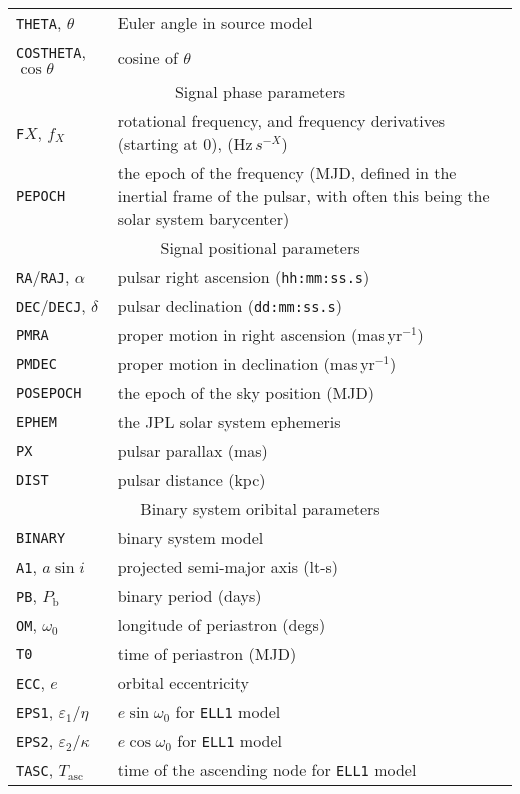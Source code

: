 \begin{longtable}{p{}|p{}}
{\tt THETA}, $\theta$ & Euler angle in source model \citep[see][]{2015MNRAS.453.4399P} \\
{\tt COSTHETA}, $\cos{\theta}$ & cosine of $\theta$ \\
\hline
\multicolumn{2}{c}{Signal phase parameters} \\
\hline
{\tt F}$X$, $f_X$ & rotational frequency, and frequency derivatives (starting at 0), (Hz$\,s^{-X}$) \\
{\tt PEPOCH} & the epoch of the frequency (MJD, defined in the inertial frame of the pulsar, with often this being the solar system barycenter) \\
\hline
\multicolumn{2}{c}{Signal positional parameters} \\
\hline
{\tt RA}/{\tt RAJ}, $\alpha$ & pulsar right ascension ({\tt hh:mm:ss.s}) \\
{\tt DEC}/{\tt DECJ}, $\delta$ & pulsar declination ({\tt dd:mm:ss.s}) \\
{\tt PMRA} & proper motion in right ascension (mas\,yr$^{-1}$) \\
{\tt PMDEC} & proper motion in declination (mas\,yr$^{-1}$) \\
{\tt POSEPOCH} & the epoch of the sky position (MJD) \\
{\tt EPHEM} & the JPL solar system ephemeris \\
{\tt PX} & pulsar parallax (mas) \\
{\tt DIST} & pulsar distance (kpc) \\
\hline
\multicolumn{2}{c}{Binary system oribital parameters} \\
\hline
{\tt BINARY} & binary system model \citep[see e.g.][and references therein]{1989ApJ...345..434T} \\
{\tt A1}, $a\sin{i}$ & projected semi-major axis (lt-s) \\
{\tt PB}, $P_{\text{b}}$ & binary period (days) \\
{\tt OM}, $\omega_0$ & longitude of periastron (degs) \\
{\tt T0} & time of periastron (MJD) \\
{\tt ECC}, $e$ & orbital eccentricity \\
{\tt EPS1}, $\varepsilon_1$/$\eta$ & $e\sin{\omega_0}$ for {\tt ELL1} model \citep[see Appendix in][]{2001MNRAS.326..274L} \\
{\tt EPS2}, $\varepsilon_2$/$\kappa$ & $e\cos{\omega_0}$ for {\tt ELL1} model \citep[see Appendix in][]{2001MNRAS.326..274L} \\
{\tt TASC}, $T_{\text{asc}}$ & time of the ascending node for {\tt ELL1} model \citep[see Appendix in][]{2001MNRAS.326..274L} \\

\end{longtable}
